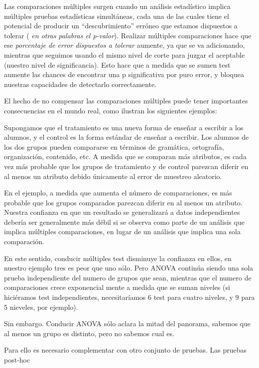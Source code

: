 \documentclass[
]{book}
\begin{document}
Las comparaciones múltiples surgen cuando un análisis estadístico implica múltiples pruebas estadísticas simultáneas, cada una de las cuales tiene el potencial de producir un ``descubrimiento'' erróneo que estamos dispuestos a tolerar ( \emph{en otras palabras el p-valor}). Realizar múltiples comparaciones hace que ese \emph{porcentaje de error dispuestos a tolerar} aumente, ya que se va adicionando, mientras que seguimos usando el mismo nivel de corte para juzgar el aceptable (nuestro nivel de significancia). Esto hace que a medida que se sumen test aumente las chances de encontrar una p significativa por puro error, y bloquea nuestras capacidades de detectarlo correctamente.

El hecho de no compensar las comparaciones múltiples puede tener importantes consecuencias en el mundo real, como ilustran los siguientes ejemplos:

Supongamos que el tratamiento es una nueva forma de enseñar a escribir a los alumnos, y el control es la forma estándar de enseñar a escribir. Los alumnos de los dos grupos pueden compararse en términos de gramática, ortografía, organización, contenido, etc. A medida que se comparan más atributos, es cada vez más probable que los grupos de tratamiento y de control parezcan diferir en al menos un atributo debido únicamente al error de muestreo aleatorio.

En el ejemplo, a medida que aumenta el número de comparaciones, es más probable que los grupos comparados parezcan diferir en al menos un atributo. Nuestra confianza en que un resultado se generalizará a datos independientes debería ser generalmente más débil si se observa como parte de un análisis que implica múltiples comparaciones, en lugar de un análisis que implica una sola comparación.

En este sentido, conducir múltiples test disminuye la confianza en ellos, en nuestro ejemplo tres es peor que uno sólo. Pero ANOVA continúa siendo una sola prueba independiente del numero de grupos que sean, mientras que el numero de comparaciones crece exponencial mente a medida que se suman niveles (si hiciéramos test independientes, necesitaríamos 6 test para cuatro niveles, y 9 para 5 nieveles, por ejemplo).

Sin embargo. Conducir ANOVA sólo aclara la mitad del panorama, sabemos que al menos un grupo es distinto, pero no sabemos cual es.

Para ello es necesario complementar con otro conjunto de pruebas. Las pruebas post-hoc
\end{document}
